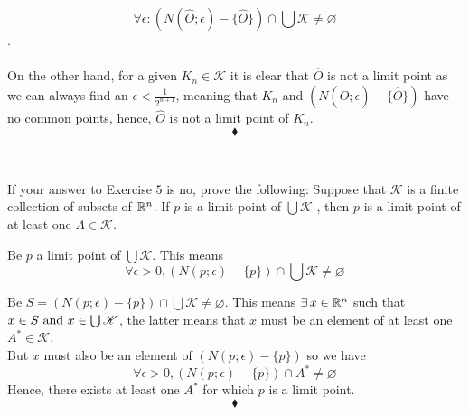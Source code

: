 $$\forall \epsilon :\left(N(\hat{O};\epsilon)-\{\hat{O}\}\right)\cap \bigcup \mathscr{K}\neq \varnothing$$.\\\\
On the other hand, for a given $K_n\in \mathscr{K}$ it is clear that $\hat{O}$ is not a limit point as we can always find an $\epsilon < \frac{1}{2^{n+1}}$, meaning that $K_n$ and $\left(N(\hat{O};\epsilon)-\{\hat{O}\}\right)$ have no common points, hence, $\hat{O}$ is not a limit point of $K_n$.
$$\blacklozenge$$\\


\subsection{}
\begin{tcolorbox}
If your answer to Exercise $5$ is no, prove the following: Suppose that $\mathscr{K}$ is a finite collection of subsets of $\mathbb{R}^n$. If $p$ is a limit point of $\bigcup \mathscr{K}$ , then $p$ is a limit point of at least one $A \in \mathscr{K}$.
\end{tcolorbox}
Be $p$ a limit point of $\bigcup \mathscr{K}$. This means
$$\forall  \epsilon >0, \left(N(p;\epsilon)-\{p\}\right)\cap \bigcup \mathscr{K}\neq \varnothing$$

Be $S=\left(N(p;\epsilon)-\{p\}\right)\cap \bigcup \mathscr{K}\neq \varnothing$. This means $\exists\, x\in\mathbb{R}^n$ such that $ x\in S\text{ and } x\in \bigcup\mathscr{K}$, the latter means that $x$ must be an element of at least one $A^{*}\in \mathscr{K}$.\\
But $x$ must also be an element of $\left(N(p;\epsilon)-\{p\}\right)$ so we have 
$$\forall  \epsilon >0, \left(N(p;\epsilon)-\{p\}\right)\cap A^{*}\neq \varnothing$$
Hence, there exists at least one $A^*$ for which $p$ is a limit point.
$$\blacklozenge$$\\

